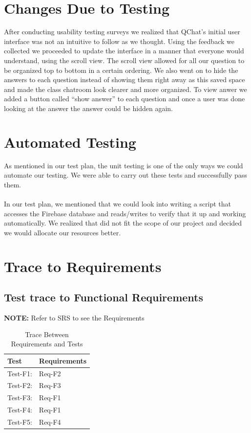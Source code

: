 \documentclass[12pt, titlepage]{article}
\begin{document}
\section{Changes Due to Testing}

After conducting usability testing surveys we realized that QChat’s initial user interface was not an intuitive to follow as we thought. Using the feedback we collected we proceeded to update the interface in a manner that everyone would understand, using the scroll view. The scroll view allowed for all our question to be organized top to bottom in a certain ordering. We also went on to hide the answers to each question instead of showing them right away as this saved space and made the class chatroom look clearer and more organized. To view anwer we added a button called “show answer” to each question and once a user was done looking at the answer the answer could be hidden again.

\section{Automated Testing}

As mentioned in our test plan, the unit testing is one of the only ways we could automate our testing. We were able to carry out these tests and successfully pass them.\\
\\
In our test plan, we mentioned that we could look into writing a script that accesses the Firebase database and reads/writes to verify that it up and working automatically. We realized that did not fit the scope of our project and decided we would allocate our resources better. 

\section{Trace to Requirements}

\subsection{Test trace to Functional Requirements}

\textbf{NOTE:} Refer to SRS to see the Requirements\\

\begin{table}[!h]
\centering
\begin{tabular}{p{} p{}}
\toprule
\textbf{Test} & \textbf{Requirements}\\
\midrule
Test-F1:  & Req-F2 \\
Test-F2:  & Req-F3   \\
Test-F3:  & Req-F1 \\
Test-F4:  & Req-F1 \\
Test-F5:  & Req-F4 \\
\bottomrule
\end{tabular}
\caption{Trace Between Requirements and Tests}
\label{TblRT}
\end{table}
\end{document}
